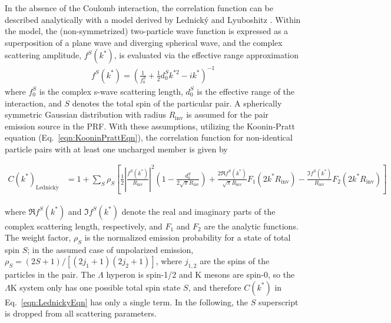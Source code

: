 \documentclass[ALICE,manyauthors]{cernphprep}
\newcommand{\Lam}{$\Lambda$\xspace}
\newcommand{\LamK}{$\Lambda$K\xspace}
\begin{document}
In the absence of the Coulomb interaction, the correlation function can be described analytically with a model derived by Lednick\'y and Lyuboshitz \cite{Lednicky:82}.
Within the model, the (non-symmetrized) two-particle wave function is expressed as a superposition of a plane wave and diverging spherical wave, and the complex scattering amplitude, $f^{S}(k^{*})$, is evaluated via the effective range approximation
\begin{equation}
\begin{aligned}
f^{S}(k^{*}) = \left( \frac{1}{f^{S}_{0}} + \frac{1}{2}d^{S}_{0}k^{*2} - ik^{*} \right)^{-1}
\end{aligned}
\label{eqn:ScatteringParam}
\end{equation}
where $f^{S}_{0}$ is the complex s-wave scattering length, $d^{S}_{0}$ is the effective range of the interaction, and $S$ denotes the total spin of the particular pair.
A spherically symmetric Gaussian distribution with radius $R_{\mathrm{inv}}$  is assumed for the pair emission source in the PRF.
With these assumptions, utilizing the Koonin-Pratt equation (Eq.\ \ref{eqn:KooninPrattEqn}), the correlation function for non-identical particle pairs with at least one uncharged member is given by \cite{Lednicky:82}

\begin{equation}
\begin{aligned}
C(k^{*})_{\mathrm{Lednick\acute{y}}} &= 1 + \sum_{S}\rho_{S}\left[\frac{1}{2}\left|\frac{f^{S}(k^{*})}{R_{\mathrm{inv}}}\right|^2\left(1-\frac{d^{S}_{0}}{2\sqrt{\pi}R_{\mathrm{inv}}}\right)+\frac{2\Re f^{S}(k^{*})}{\sqrt{\pi}R_{\mathrm{inv}}}F_{1}(2k^{*}R_{\mathrm{inv}})-\frac{\Im f^{S}(k^{*})}{R_{\mathrm{inv}}}F_{2}(2k^{*}R_{\mathrm{inv}})\right]
\end{aligned}  
\label{eqn:LednickyEqn}
\end{equation}

where $\Re f^{S}(k^{*})$ and $\Im f^{S}(k^{*})$ denote the real and imaginary parts of the complex scattering length, respectively, and $F_{1}$ and $F_{2}$ are the analytic functions.
The weight factor, $\rho_{S}$ is the normalized emission probability for a state of total spin $S$; in the assumed case of unpolarized emission, $\rho_{S} = (2S+1)/[(2j_{1}+1)(2j_{2}+1)]$, where $j_{1,2}$ are the spins of the particles in the pair.
The \Lam hyperon is spin-1/2 and K mesons are spin-0, so the \LamK system only has one possible total spin state $S$, and therefore $C(k^{*})$ in Eq.\ \ref{eqn:LednickyEqn} has only a single term.
In the following, the $S$ superscript is dropped from all scattering parameters.
\end{document}
